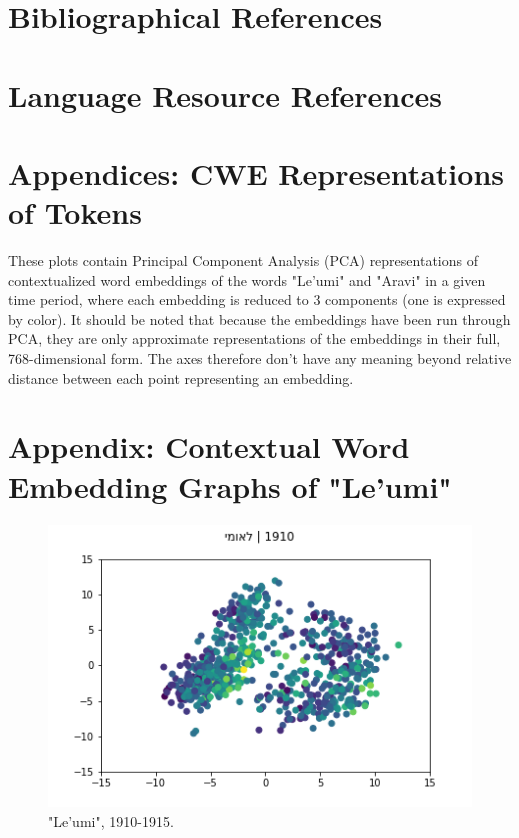 \documentclass[10pt, a4paper]{article}
\begin{document}
\nocite{*}
\section{Bibliographical References}\label{reference}




\section{Language Resource References}
\label{lr:ref}

\section*{Appendices: CWE Representations of Tokens}
These plots contain Principal Component Analysis (PCA) representations of contextualized word embeddings of the words "Le'umi" and "Aravi" in a given time period, where each embedding is reduced to 3 components (one is expressed by color). It should be noted that because the embeddings have been run through PCA, they are only approximate representations of the embeddings in their full, 768-dimensional form. The axes therefore don't have any meaning beyond relative distance between each point representing an embedding.

\section*{Appendix: Contextual Word Embedding Graphs of "Le'umi"}
\begin{figure}[!h]
\begin{center}
\includegraphics[scale=0.5]{LREC_PAPER/leumi_cwes/1910.png}
\caption{"Le'umi", 1910-1915.}
\label{Leumi1}
\end{center}
\end{figure}
\end{document}
